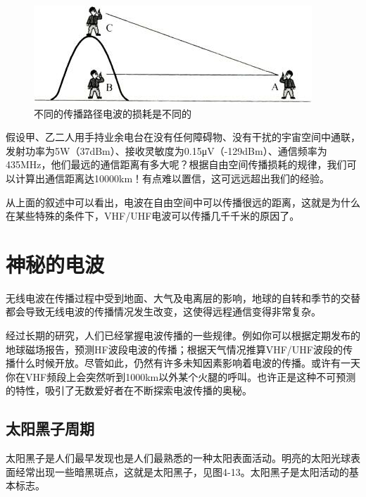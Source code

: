 \documentclass[12pt,UTF8]{ctexbook}
\begin{document}
\begin{figure}[htbp]
	\centering
	\includegraphics[width=0.7\linewidth]{55}
	\caption{不同的传播路径电波的损耗是不同的}
	\label{fig:1}
\end{figure}

假设甲、乙二人用手持业余电台在没有任何障碍物、没有干扰的宇宙空间中通联，发射功率为5W（37dBm）、接收灵敏度为0.15μV（-129dBm）、通信频率为435MHz，他们最远的通信距离有多大呢？根据自由空间传播损耗的规律，我们可以计算出通信距离达10000km！有点难以置信，这可远远超出我们的经验。

从上面的叙述中可以看出，电波在自由空间中可以传播很远的距离，这就是为什么在某些特殊的条件下，VHF/UHF电波可以传播几千千米的原因了。

\section{神秘的电波}

无线电波在传播过程中受到地面、大气及电离层的影响，地球的自转和季节的交替都会导致无线电波的传播情况发生改变，这使得远程通信变得非常复杂。

经过长期的研究，人们已经掌握电波传播的一些规律。例如你可以根据定期发布的地球磁场报告，预测HF波段电波的传播；根据天气情况推算VHF/UHF波段的传播什么时候开放。尽管如此，仍然有许多未知因素影响着电波的传播。或许有一天你在VHF频段上会突然听到1000km以外某个火腿的呼叫。也许正是这种不可预测的特性，吸引了无数爱好者在不断探索电波传播的奥秘。

\subsection{太阳黑子周期}

太阳黑子是人们最早发现也是人们最熟悉的一种太阳表面活动。明亮的太阳光球表面经常出现一些暗黑斑点，这就是太阳黑子，见图4-13。太阳黑子是太阳活动的基本标志。
\end{document}
